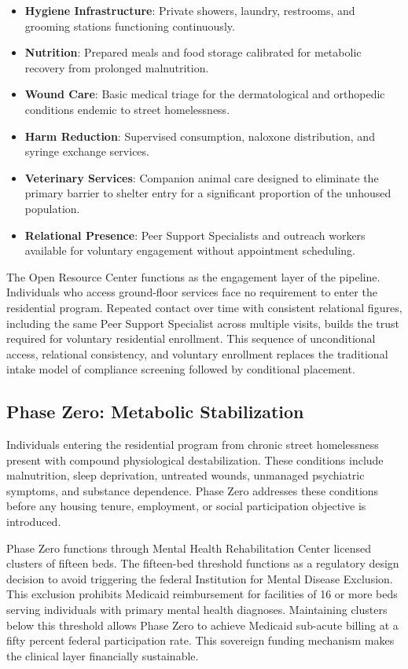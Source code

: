 \documentclass[12pt, letterpaper]{article}
\begin{document}
\begin{itemize}
    \item \textbf{Hygiene Infrastructure}: Private showers, laundry, restrooms, and grooming stations functioning continuously.
    \item \textbf{Nutrition}: Prepared meals and food storage calibrated for metabolic recovery from prolonged malnutrition.
    \item \textbf{Wound Care}: Basic medical triage for the dermatological and orthopedic conditions endemic to street homelessness.
    \item \textbf{Harm Reduction}: Supervised consumption, naloxone distribution, and syringe exchange services.
    \item \textbf{Veterinary Services}: Companion animal care designed to eliminate the primary barrier to shelter entry for a significant proportion of the unhoused population.
    \item \textbf{Relational Presence}: Peer Support Specialists and outreach workers available for voluntary engagement without appointment scheduling.
\end{itemize}

The Open Resource Center functions as the engagement layer of the pipeline. Individuals who access ground-floor services face no requirement to enter the residential program. Repeated contact over time with consistent relational figures, including the same Peer Support Specialist across multiple visits, builds the trust required for voluntary residential enrollment. This sequence of unconditional access, relational consistency, and voluntary enrollment replaces the traditional intake model of compliance screening followed by conditional placement.

\subsection{Phase Zero: Metabolic Stabilization}

Individuals entering the residential program from chronic street homelessness present with compound physiological destabilization. These conditions include malnutrition, sleep deprivation, untreated wounds, unmanaged psychiatric symptoms, and substance dependence. Phase Zero addresses these conditions before any housing tenure, employment, or social participation objective is introduced.

Phase Zero functions through Mental Health Rehabilitation Center licensed clusters of fifteen beds. The fifteen-bed threshold functions as a regulatory design decision to avoid triggering the federal Institution for Mental Disease Exclusion. This exclusion prohibits Medicaid reimbursement for facilities of 16 or more beds serving individuals with primary mental health diagnoses. Maintaining clusters below this threshold allows Phase Zero to achieve Medicaid sub-acute billing at a fifty percent federal participation rate. This sovereign funding mechanism makes the clinical layer financially sustainable.
\end{document}
